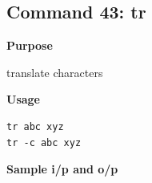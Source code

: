 \subsection{Command 43: tr} 
\textbf{Purpose}
\begin{flushleft}
 translate characters
\end{flushleft}
\textbf{Usage}
\begin{verbatim}
tr abc xyz
tr -c abc xyz
\end{verbatim}
\textbf{Sample i/p and o/p}
\begin{figure}[H] 
\end{figure}
